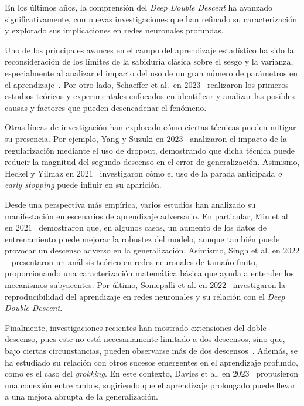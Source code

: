 En los últimos años, la comprensión del \textit{Deep Double Descent} ha avanzado significativamente, con nuevas investigaciones que han refinado su caracterización y explorado sus implicaciones en redes neuronales profundas.\newline

Uno de los principales avances en el campo del aprendizaje estadístico ha sido la reconsideración de los límites de la sabiduría clásica sobre el sesgo y la varianza, especialmente al analizar el impacto del uso de un gran número de parámetros en el aprendizaje~\cite{Zhang2021,Curth2023}. Por otro lado, Schaeffer et al.\ en $2023$~\cite{Schaeffer2023} realizaron los primeros estudios teóricos y experimentales enfocados en identificar y analizar las posibles causas y factores que pueden desencadenar el fenómeno.\newline

Otras líneas de investigación han explorado cómo ciertas técnicas pueden mitigar su presencia. Por ejemplo, Yang y Suzuki en $2023$~\cite{Yang2024} analizaron el impacto de la regularización mediante el uso de dropout, demostrando que dicha técnica puede reducir la magnitud del segundo descenso en el error de generalización. Asimismo, Heckel y Yilmaz en $2021$~\cite{Heckel2020} investigaron cómo el uso de la parada anticipada \emph{o early stopping} puede influir en su aparición.\newline

Desde una perspectiva más empírica, varios estudios han analizado su manifestación en escenarios de aprendizaje adversario. En particular, Min et al. en $2021$~\cite{Ming2020} demostraron que, en algunos casos, un aumento de los datos de entrenamiento puede mejorar la robustez del modelo, aunque también puede provocar un descenso adverso en la generalización. Asimismo, Singh et al. en $2022$~\cite{Singh2022} presentaron un análisis teórico en redes neuronales de tamaño finito, proporcionando una caracterización matemática básica que ayuda a entender los mecanismos subyacentes. Por último, Somepalli et al. en $2022$~\cite{Somepalli2022} investigaron la reproducibilidad del aprendizaje en redes neuronales y su relación con el \textit{Deep Double Descent}.\newline

Finalmente, investigaciones recientes han mostrado extensiones del doble descenso, pues este no está necesariamente limitado a dos descensos, sino que, bajo ciertas circunstancias, pueden observarse más de dos descensos~\cite{d_Ascoli2021, Chen2021}. Además, se ha estudiado su relación con otros sucesos emergentes en el aprendizaje profundo, como es el caso del \emph{grokking}. En este contexto, Davies et al. en $2023$~\cite{Davies2023} propusieron una conexión entre ambos, sugiriendo que el aprendizaje prolongado puede llevar a una mejora abrupta de la generalización.\newline

